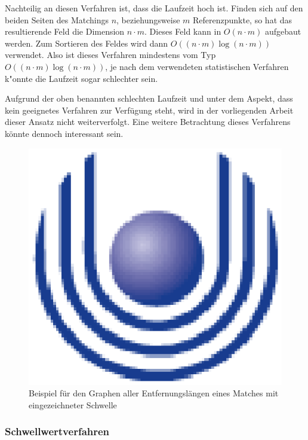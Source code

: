 Nachteilig an diesen Verfahren ist, dass die Laufzeit hoch ist. Finden sich auf den beiden Seiten des Matchings $n$, beziehungsweise $m$ Referenzpunkte, so hat das resultierende Feld die Dimension $n\cdot m$. Dieses Feld kann in $O(n\cdot m)$ aufgebaut werden. Zum Sortieren des Feldes wird dann $O((n\cdot m)\log(n\cdot m))$ verwendet. Also ist dieses Verfahren mindestens vom Typ $O((n\cdot m)\log(n\cdot m))$, je nach dem verwendeten statistischen Verfahren k"onnte die Laufzeit sogar schlechter sein.

Aufgrund der oben benannten schlechten Laufzeit und unter dem Aspekt, dass kein geeignetes Verfahren zur Verfügung steht, wird in der vorliegenden Arbeit dieser Ansatz nicht weiterverfolgt. Eine weitere Betrachtung dieses Verfahrens könnte dennoch interessant sein.

\begin{figure}
	\centering
	\includegraphics{feu_logo2.eps}
	\caption[Beispiel für eine statistische Analyse]{Beispiel für den Graphen aller Entfernungslängen eines Matches mit eingezeichneter Schwelle}
	\label{fig:statistik}
\end{figure}


\subsubsection*{Schwellwertverfahren}\label{Schwellwert}

